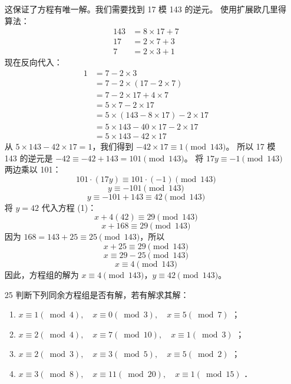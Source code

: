 \begin{enumerate}
\begin{solution}
        这保证了方程有唯一解。我们需要找到 17 模 143 的逆元。
        使用扩展欧几里得算法：
        \begin{align*} 143 &= 8 \times 17 + 7 \\ 17 &= 2 \times 7 + 3 \\ 7 &= 2 \times 3 + 1 \end{align*}
        现在反向代入：
        \begin{align*} 1 &= 7 - 2 \times 3 \\ &= 7 - 2 \times (17 - 2 \times 7) \\ &= 7 - 2 \times 17 + 4 \times 7 \\ &= 5 \times 7 - 2 \times 17 \\ &= 5 \times (143 - 8 \times 17) - 2 \times 17 \\ &= 5 \times 143 - 40 \times 17 - 2 \times 17 \\ &= 5 \times 143 - 42 \times 17 \end{align*}
        从 $5 \times 143 - 42 \times 17 = 1$，我们得到 $-42 \times 17 \equiv 1 \pmod{143}$。
        所以 17 模 143 的逆元是 $-42 \equiv -42 + 143 = 101 \pmod{143}$。
        将 $17y \equiv -1 \pmod{143}$ 两边乘以 101：
        \[ 101 \cdot (17y) \equiv 101 \cdot (-1) \pmod{143} \]
        \[ y \equiv -101 \pmod{143} \]
        \[ y \equiv -101 + 143 \equiv 42 \pmod{143} \]
        将 $y=42$ 代入方程 (1)：
        \[ x + 4(42) \equiv 29 \pmod{143} \]
        \[ x + 168 \equiv 29 \pmod{143} \]
        因为 $168 = 143 + 25 \equiv 25 \pmod{143}$，所以
        \[ x + 25 \equiv 29 \pmod{143} \]
        \[ x \equiv 29 - 25 \pmod{143} \]
        \[ x \equiv 4 \pmod{143} \]
        因此，方程组的解为 $x \equiv 4 \pmod{143}$，$y \equiv 42 \pmod{143}$。
    \end{solution}
    \item[25] 判断下列同余方程组是否有解，若有解求其解：
    \begin{enumerate}
        \item $x \equiv 1(\bmod 4), \quad x \equiv 0(\bmod 3), \quad x \equiv 5(\bmod 7)$ ；
        \item $x \equiv 2(\bmod 4), \quad x \equiv 7(\bmod 10), \quad x \equiv 1(\bmod 3)$ ；
        \item $x \equiv 2(\bmod 3), \quad x \equiv 3(\bmod 5), \quad x \equiv 5(\bmod 2)$ ；
        \item $x \equiv 3(\bmod 8), \quad x \equiv 11(\bmod 20), \quad x \equiv 1(\bmod 15)$ ．
    \end{enumerate}
    \begin{solution}

\end{solution}
\end{enumerate}

